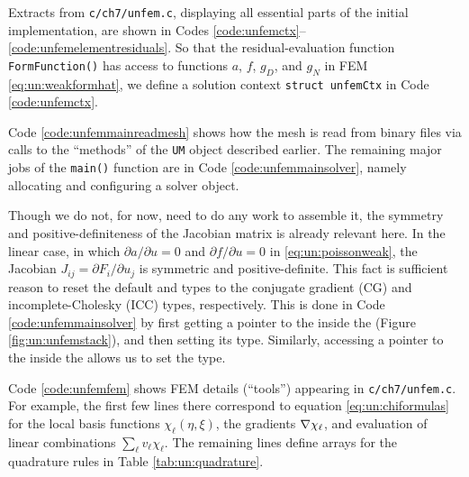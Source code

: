 Extracts from \texttt{c/ch7/unfem.c}, displaying all essential parts of the initial implementation, are shown in Codes \ref{code:unfemctx}--\ref{code:unfemelementresiduals}.  So that the residual-evaluation function \texttt{FormFunction()} has access to functions $a$, $f$, $g_D$, and $g_N$ in FEM \eqref{eq:un:weakformhat}, we define a solution context \texttt{struct unfemCtx} in Code \ref{code:unfemctx}.


Code \ref{code:unfemmainreadmesh} shows how the mesh is read from \PETSc binary files via calls to the ``methods'' of the \texttt{UM} object described earlier.  The remaining major jobs of the \texttt{main()} function are in Code \ref{code:unfemmainsolver}, namely allocating \pVecs and configuring a \pSNES solver object.


Though we do not, for now, need to do any work to assemble it, the symmetry and positive-definiteness of the Jacobian matrix is already relevant here.  In the linear case, in which $\partial a/\partial u=0$ and $\partial f/\partial u=0$ in \eqref{eq:un:poissonweak}, the Jacobian $J_{ij} = \partial F_i/\partial u_j$ is symmetric and positive-definite.  This fact is sufficient reason to reset the default \pKSP and \pPC types to the conjugate gradient (CG) and incomplete-Cholesky (ICC) types, respectively.  This is done in Code \ref{code:unfemmainsolver} by first getting a pointer to the \pKSP inside the \pSNES (Figure \ref{fig:un:unfemstack}), and then setting its type.  Similarly, accessing a pointer to the \pPC inside the \pKSP allows us to set the \pPC type.


Code \ref{code:unfemfem} shows FEM details (``tools'') appearing in \texttt{c/ch7/unfem.c}.  For example, the first few lines there correspond to equation \eqref{eq:un:chiformulas} for the local basis functions $\chi_\ell(\eta,\xi)$, the gradients $\nabla \chi_\ell$, and evaluation of linear combinations $\sum_\ell v_\ell \chi_\ell$.  The remaining lines define arrays for the quadrature rules in Table \ref{tab:un:quadrature}.

